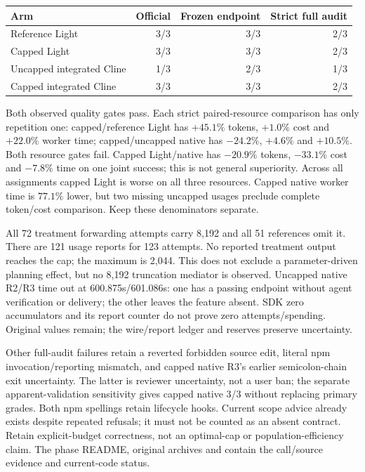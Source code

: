 \documentclass[11pt,a4paper]{article}
\newcommand{\code}[1]{\texttt{\detokenize{#1}}}
\begin{document}
\begin{center}
\begin{tabular}{lrrr}
\toprule Arm & Official & Frozen endpoint & Strict full audit \\\midrule
Reference Light & 3/3 & 3/3 & 2/3 \\
Capped Light & 3/3 & 3/3 & 2/3 \\
Uncapped integrated Cline & 1/3 & 2/3 & 1/3 \\
Capped integrated Cline & 3/3 & 3/3 & 2/3 \\\bottomrule
\end{tabular}
\end{center}
Both observed quality gates pass. Each strict paired-resource comparison has only
repetition one: capped/reference Light has $+45.1\%$ tokens, $+1.0\%$ cost and
$+22.0\%$ worker time; capped/uncapped native has $-24.2\%$, $+4.6\%$ and
$+10.5\%$. Both resource gates fail. Capped Light/native has $-20.9\%$ tokens,
$-33.1\%$ cost and $-7.8\%$ time on one joint success; this is not general
superiority. Across all assignments capped Light is worse on all three resources.
Capped native worker time is $77.1\%$ lower, but two missing uncapped usages
preclude complete token/cost comparison. Keep these denominators separate.

All 72 treatment forwarding attempts carry 8,192 and all 51 references omit it.
There are 121 usage reports for 123 attempts. No reported treatment output reaches
the cap; the maximum is 2,044. This does not exclude a parameter-driven planning
effect, but no 8,192 truncation mediator is observed. Uncapped native R2/R3 time
out at 600.875s/601.086s: one has a passing endpoint without agent verification or
delivery; the other leaves the feature absent. SDK zero accumulators and its
\code{context.modelRequests} report counter do not prove zero attempts/spending.
Original values remain; the wire/report ledger and reserves preserve uncertainty.

Other full-audit failures retain a reverted forbidden source edit, literal npm
invocation/reporting mismatch, and capped native R3's earlier semicolon-chain
exit uncertainty. The latter is reviewer uncertainty, not a user ban; the separate
apparent-validation sensitivity gives capped native 3/3 without replacing primary
grades. Both npm spellings retain lifecycle hooks. Current scope advice already
exists despite repeated refusals; it must not be counted as an absent contract.
Retain explicit-budget correctness, not an optimal-cap or population-efficiency
claim. The phase README, original archives and \code{findings.md} contain the
call/source evidence and current-code status.
\end{document}
